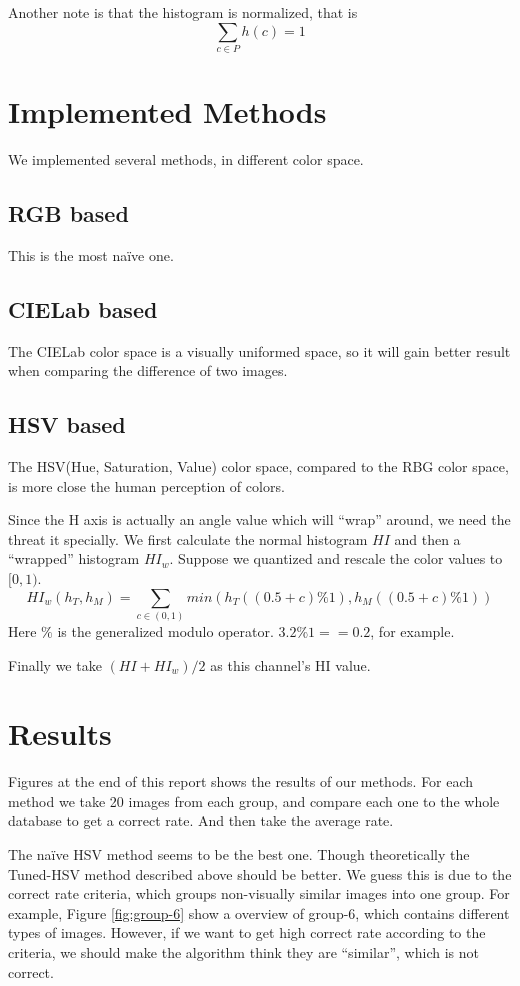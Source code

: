 \documentclass[11pt,a4paper]{article}
\begin{document}
Another note is that the histogram is normalized, that is \[
    \sum_{c \in P} h(c) = 1
\]

\section{Implemented Methods}
We implemented several methods, in different color space.

\subsection{RGB based}
This is the most naïve one.
\subsection{CIELab based}
The CIELab color space is a visually uniformed space, so it will gain better result when comparing the difference of 
two images.

\subsection{HSV based}
The HSV(Hue, Saturation, Value) color space, compared to the RBG color space, is more close the human perception of colors.

Since the H axis is actually an angle value which will ``wrap'' around, we need the threat it specially. We first calculate
the normal histogram $HI$ and then a ``wrapped'' histogram $HI_w$. Suppose we quantized and rescale the color values to $[0, 1)$.
\[
HI_w(h_T, h_M) = \sum_{c \in (0, 1)} min(h_T((0.5 + c)\% 1), h_M( (0.5 + c) \% 1))
\]
Here $\%$ is the generalized modulo operator. $ 3.2 \% 1 ==  0.2 $, for example.

Finally we take $(HI + HI_w) / 2 $ as this channel's HI value.

\section{Results}
Figures at the end of this report shows the results of our methods. For each method
we take 20 images from each group, and compare each one to the whole database to get a
correct rate. And then take the average rate.

The naïve HSV method seems to be the best one. Though theoretically the Tuned-HSV method described above should be better.
We guess this is due to the correct rate criteria, which groups non-visually similar images into one group. For example,
Figure \ref{fig:group-6} show a overview of group-6, which contains different types of images. However, if we want to get
high correct rate according to the criteria, we should make the algorithm think they are ``similar'', which is not correct.
\end{document}
